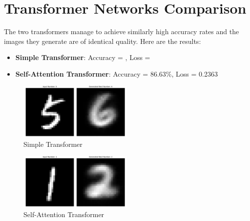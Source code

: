 \documentclass[lettersize,journal]{IEEEtran}
\begin{document}
\section{Transformer Networks Comparison}
The two transformers manage to achieve similarly high accuracy rates and the images they generate
are of identical quality. Here are the results:
\begin{itemize}
    \item \textbf{Simple Transformer}: Accuracy = , Loss = 
    \item \textbf{Self-Attention Transformer}: Accuracy = 86.63\%, Loss = 0.2363 
\end{itemize}
\begin{figure}[H]   
    \centering
    \includegraphics[width=0.5\textwidth]{media/Simple.png}
    \caption{Simple Transformer}
\end{figure}
\begin{figure}[H]   
    \centering
    \includegraphics[width=0.5\textwidth]{media/Self_Attention.png}
    \caption{Self-Attention Transformer}
\end{figure}

\end{document}
